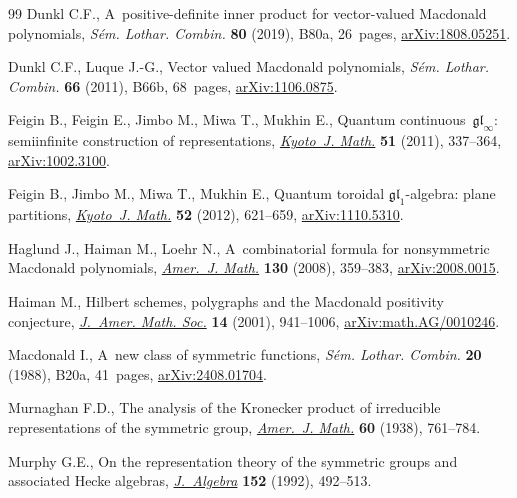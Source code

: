 \begin{thebibliography}{99}
Dunkl C.F., A~positive-definite inner product for vector-valued {M}acdonald
 polynomials, \textit{S\'em. Lothar. Combin.} \textbf{80} (2019), B80a,
 26~pages, \href{http://arxiv.org/abs/1808.05251}{arXiv:1808.05251}.

Dunkl C.F., Luque J.-G., Vector valued {M}acdonald polynomials, \textit{S\'em.
 Lothar. Combin.} \textbf{66} (2011), B66b, 68~pages,
 \href{http://arxiv.org/abs/1106.0875}{arXiv:1106.0875}.

Feigin B., Feigin E., Jimbo M., Miwa T., Mukhin E., Quantum
 continuous~{$\mathfrak{gl}_\infty$}: semiinfinite construction of
 representations,
 \href{https://doi.org/10.1215/21562261-1214375}{\textit{Kyoto~J. Math.}}
 \textbf{51} (2011), 337--364,
 \href{http://arxiv.org/abs/1002.3100}{arXiv:1002.3100}.

Feigin B., Jimbo M., Miwa T., Mukhin E., Quantum toroidal
 {$\mathfrak{gl}_1$}-algebra: plane partitions,
 \href{https://doi.org/10.1215/21562261-1625217}{\textit{Kyoto~J. Math.}}
 \textbf{52} (2012), 621--659,
 \href{http://arxiv.org/abs/1110.5310}{arXiv:1110.5310}.

Haglund J., Haiman M., Loehr N., A~combinatorial formula for nonsymmetric
 {M}acdonald polynomials,
 \href{https://doi.org/10.1353/ajm.2008.0015}{\textit{Amer.~J. Math.}}
 \textbf{130} (2008), 359--383,
 \href{http://arxiv.org/abs/2008.0015}{arXiv:2008.0015}.

Haiman M., Hilbert schemes, polygraphs and the {M}acdonald positivity
 conjecture,
 \href{https://doi.org/10.1090/S0894-0347-01-00373-3}{\textit{J.~Amer. Math.
 Soc.}} \textbf{14} (2001), 941--1006,
 \href{http://arxiv.org/abs/math.AG/0010246}{arXiv:math.AG/0010246}.

Macdonald I., A~new class of symmetric functions, \textit{S\'em. Lothar.
 Combin.} \textbf{20} (1988), B20a, 41~pages,
 \href{http://arxiv.org/abs/2408.01704}{arXiv:2408.01704}.

Murnaghan F.D., The analysis of the {K}ronecker product of irreducible
 representations of the symmetric group,
 \href{https://doi.org/10.2307/2371610}{\textit{Amer.~J. Math.}} \textbf{60}
 (1938), 761--784.

Murphy G.E., On the representation theory of the symmetric groups and
 associated {H}ecke algebras,
 \href{https://doi.org/10.1016/0021-8693(92)90045-N}{\textit{J.~Algebra}}
 \textbf{152} (1992), 492--513.


\end{thebibliography}
